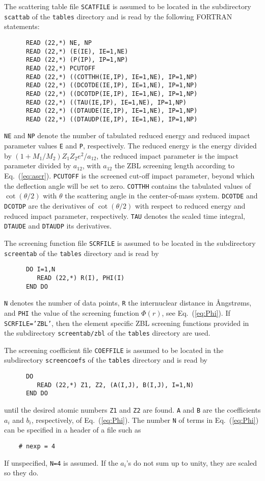 The scattering table file \texttt{SCATFILE} is assumed to be located in the
subdirectory \texttt{scattab} of the \texttt{tables} directory and is read by
the following FORTRAN statements:
%
\begin{verbatim}
      READ (22,*) NE, NP
      READ (22,*) (E(IE), IE=1,NE)
      READ (22,*) (P(IP), IP=1,NP)
      READ (22,*) PCUTOFF
      READ (22,*) ((COTTHH(IE,IP), IE=1,NE), IP=1,NP)
      READ (22,*) ((DCOTDE(IE,IP), IE=1,NE), IP=1,NP)
      READ (22,*) ((DCOTDP(IE,IP), IE=1,NE), IP=1,NP)
      READ (22,*) ((TAU(IE,IP), IE=1,NE), IP=1,NP)
      READ (22,*) ((DTAUDE(IE,IP), IE=1,NE), IP=1,NP)
      READ (22,*) ((DTAUDP(IE,IP), IE=1,NE), IP=1,NP)
\end{verbatim}
%
\texttt{NE} and \texttt{NP} denote the number of tabulated reduced energy and
reduced impact parameter values \texttt{E} and \texttt{P}, respectively. The
reduced energy is the energy divided by $(1+M_1/M_2)Z_1Z_2e^2/a_{12}$, the
reduced impact parameter is the impact parameter divided by $a_{12}$, with
$a_{12}$ the ZBL screening length according to Eq.~(\ref{eq:ascr}).
\texttt{PCUTOFF} is the screened cut-off impact parameter, beyond which the
deflection angle will be set to zero.  \texttt{COTTHH} contains the tabulated
values of $\cot(\theta/2)$ with $\theta$ the scattering angle in the
center-of-mass system. \texttt{DCOTDE} and \texttt{DCOTDP} are the derivatives
of $\cot(\theta/2)$ with respect to reduced energy and reduced impact
parameter, respectively. \texttt{TAU} denotes the scaled time integral,
\texttt{DTAUDE} and \texttt{DTAUDP} its derivatives.

The screening function file \texttt{SCRFILE} is assumed to be located in the
subdirectory \texttt{screentab} of the \texttt{tables} directory and is read by
%
\begin{verbatim}
      DO I=1,N
         READ (22,*) R(I), PHI(I)
      END DO 
\end{verbatim}
%
\texttt{N} denotes the number of data points, \texttt{R} the internuclear
distance in {\AA}ngstr{\o}ms, and \texttt{PHI} the value of the screening
function $\Phi(r)$, see Eq.~(\ref{eq:Phi}). If \texttt{SCRFILE='ZBL'}, then
the element specific ZBL screening functions provided in the subdirectory
\texttt{screentab/zbl} of the \texttt{tables} directory are used.

The screening coefficient file \texttt{COEFFILE} is assumed to be located in the
subdirectory \texttt{screencoefs} of the \texttt{tables} directory and is read
by
%
\begin{verbatim}
      DO
         READ (22,*) Z1, Z2, (A(I,J), B(I,J), I=1,N)
      END DO 
\end{verbatim}
%
until the desired atomic numbers \texttt{Z1} and \texttt{Z2} are found.
\texttt{A} and \texttt{B} are the coefficients $a_i$ and $b_i$, respectively, 
of Eq.~(\ref{eq:Phi}). The number \texttt{N} of terms in Eq.~(\ref{eq:Phi}) 
can be specified in a header of a file such as
%
\begin{verbatim}
    # nexp = 4
\end{verbatim}
%
If unspecified, \texttt{N=4} is assumed. If the $a_i$'s do not sum up to unity,
they are scaled so they do.

